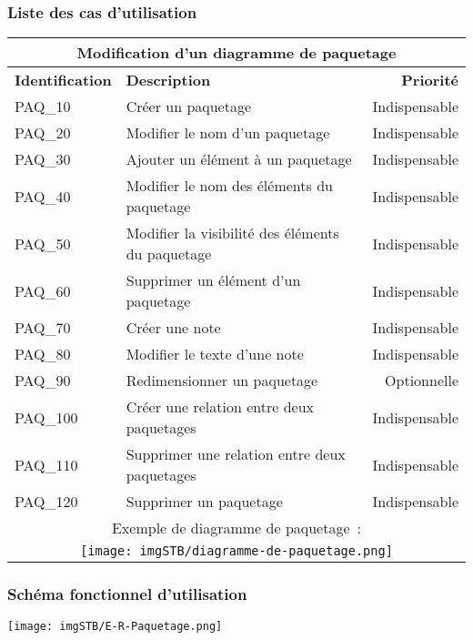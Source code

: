 \documentclass[hidelinks, 10pt,a4paper]{article}
\begin{document}
\subsubsection{Liste des cas d’utilisation}
\begin{center}
    \begin{tabular}{|l|p{8cm}|r|}
        \hline\multicolumn{3}{|c|}{Modification d'un diagramme de paquetage} \\\hline
        {\textbf{Identification}} & {\textbf{Description}} & {\textbf{Priorité}} \\\hline
        {PAQ\_10} & {Créer un paquetage} & {Indispensable} \\\hline
        {PAQ\_20} & {Modifier le nom d'un paquetage} & {Indispensable} \\\hline
        {PAQ\_30} & {Ajouter un élément à un paquetage} & {Indispensable} \\\hline
        {PAQ\_40} & {Modifier le nom des éléments du paquetage} & {Indispensable} \\\hline
        {PAQ\_50} & {Modifier la visibilité des éléments du paquetage} & {Indispensable} \\\hline
        {PAQ\_60} & {Supprimer un élément d'un paquetage} & {Indispensable} \\\hline
        {PAQ\_70} & {Créer une note} & {Indispensable} \\\hline
        {PAQ\_80} & {Modifier le texte d'une note} & {Indispensable} \\\hline
        {PAQ\_90} & {Redimensionner un paquetage} & {Optionnelle} \\\hline
        {PAQ\_100} & {Créer une relation entre deux paquetages} & {Indispensable} \\\hline
        {PAQ\_110} & { Supprimer une relation entre deux paquetages} & {Indispensable} \\\hline
        {PAQ\_120} & { Supprimer un paquetage} & {Indispensable} \\\hline
        \multicolumn{3}{|c|}{Exemple de diagramme de paquetage~:} \\\hline
        \multicolumn{3}{|c|}{\texttt{[image: imgSTB/diagramme-de-paquetage.png]}} \\\hline
    \end{tabular}
\end{center}

\subsubsection{Schéma fonctionnel d’utilisation}
\begin{center}
    \texttt{[image: imgSTB/E-R-Paquetage.png]}
\end{center}
\end{document}

